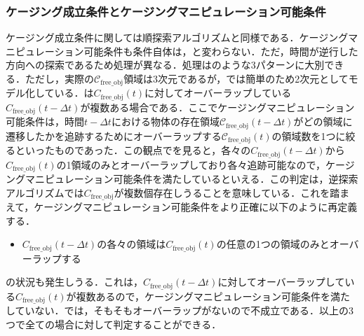 \documentclass[a4paper,twoside,12pt,papersize, dvipdfmx]{iirthesis}
\begin{document}
\subsubsection{ケージング成立条件とケージングマニピュレーション可能条件}\label{subsec::planner::revcm}
ケージング成立条件に関しては順探索アルゴリズムと同様である．ケージングマニピュレーション可能条件も条件自体は，と変わらない．ただ，時間が逆行した方向への探索であるため処理が異なる．処理はのような3パターンに大別できる．ただし，実際の$\mathcal{C}_{\mathrm{free\_obj}}$領域は3次元であるが，では簡単のため2次元としてモデル化している．は$C_{\mathrm{free\_obj}}(t)$に対してオーバーラップしている$C_{\mathrm{free\_obj}}(t-\Delta t)$が複数ある場合である．ここでケージングマニピュレーション可能条件は，時間$t-\Delta t$における物体の存在領域$\mathcal{C}_{\mathrm{free\_obj}}(t-\Delta t)$がどの領域に遷移したかを追跡するためにオーバーラップする$\mathcal{C}_{\mathrm{free\_obj}}(t)$の領域数を1つに絞るといったものであった．この観点でを見ると，各々の$C_{\mathrm{free\_obj}}(t-\Delta t)$から$C_{\mathrm{free\_obj}}(t)$の1領域のみとオーバーラップしており各々追跡可能なので，ケージングマニピュレーション可能条件を満たしているといえる．この判定は，逆探索アルゴリズムでは$C_{\mathrm{free\_obj}}$が複数個存在しうることを意味している．これを踏まえて，ケージングマニピュレーション可能条件をより正確に以下のように再定義する．
\begin{itemize}
\item $C_{\mathrm{free\_obj}}(t-\Delta t)$の各々の領域は$C_{\mathrm{free\_obj}}(t)$の任意の1つの領域のみとオーバーラップする
\end{itemize}

の状況も発生しうる．これは，$C_{\mathrm{free\_obj}}(t-\Delta t)$に対してオーバーラップしている$C_{\mathrm{free\_obj}}(t)$が複数あるので，ケージングマニピュレーション可能条件を満たしていない．では，そもそもオーバーラップがないので不成立である．以上の3つで全ての場合に対して判定することができる．
\end{document}
